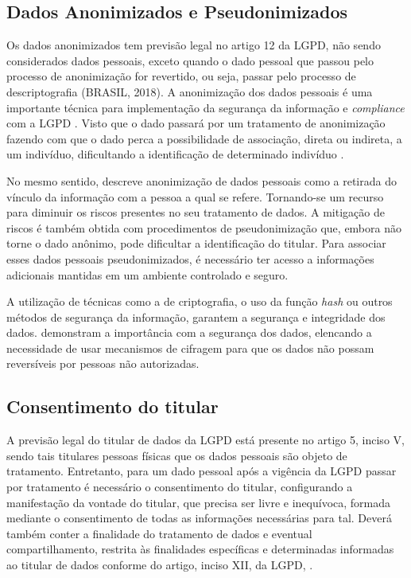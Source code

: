 \documentclass[
	12pt,				%
	openright,			%
	oneside,			%
	a4paper,			%
	english,			%
	french,				%
	spanish,			%
	brazil,				%
	]{abntex2}
\begin{document}
\subsection{Dados Anonimizados e Pseudonimizados}

Os dados anonimizados tem previsão legal no artigo 12 da LGPD, não sendo considerados dados pessoais, exceto quando o dado pessoal que passou pelo processo de anonimização for revertido, ou seja, passar pelo processo de descriptografia  (BRASIL, 2018). A anonimização dos dados pessoais é uma importante técnica para implementação da segurança da informação e \textit{compliance} com a LGPD \cite{02-01-Maroso2020}. Visto que o dado passará por um tratamento de anonimização fazendo com que o dado perca a possibilidade de associação, direta ou indireta, a um indivíduo, dificultando a identificação de determinado indivíduo \cite{Pinheiro2018}.

No mesmo sentido,  descreve anonimização de dados pessoais como a retirada do vínculo da informação com a pessoa a qual se refere. Tornando-se um recurso para diminuir os riscos presentes no seu tratamento de dados. A mitigação de riscos é também obtida com procedimentos de pseudonimização que, embora não torne o dado anônimo, pode dificultar a identificação do titular. Para associar esses dados pessoais pseudonimizados, é necessário ter acesso a informações adicionais mantidas em um ambiente controlado e seguro.

A utilização de técnicas como a de criptografia, o uso da função \textit{hash} ou outros métodos de segurança da informação, garantem a segurança e integridade dos dados.   demonstram a importância com a segurança dos dados, elencando a necessidade de usar mecanismos de cifragem para que os dados não possam reversíveis por pessoas não autorizadas.

\subsection{Consentimento do titular}
A previsão legal do titular de dados da LGPD está presente no artigo 5, inciso V, sendo tais titulares pessoas físicas que os dados pessoais são objeto de tratamento. Entretanto, para um dado pessoal após a vigência da LGPD passar por tratamento é necessário o consentimento do titular, configurando a manifestação da vontade do titular, que precisa ser livre e inequívoca, formada mediante o consentimento de todas as informações necessárias para tal. Deverá também conter a finalidade do tratamento de dados e eventual compartilhamento, restrita às finalidades específicas e determinadas informadas ao titular de dados conforme do artigo, inciso XII, da LGPD,  \cite{01-01-LeiGeral}.
\end{document}
